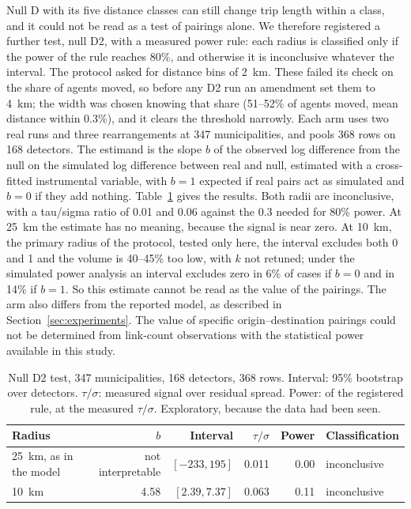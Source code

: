 \documentclass[11pt,a4paper]{article}
\begin{document}
Null D with its five distance classes can still change trip length within a class, and it could not be read as a test of pairings alone. We therefore registered a further test, null D2, with a measured power rule: each radius is classified only if the power of the rule reaches 80\%, and otherwise it is inconclusive whatever the interval. The protocol asked for distance bins of 2~km. These failed its check on the share of agents moved, so before any D2 run an amendment set them to 4~km; the width was chosen knowing that share (51--52\% of agents moved, mean distance within 0.3\%), and it clears the threshold narrowly. Each arm uses two real runs and three rearrangements at 347 municipalities, and pools 368 rows on 168 detectors. The estimand is the slope $b$ of the observed log difference from the null on the simulated log difference between real and null, estimated with a cross-fitted instrumental variable, with $b=1$ expected if real pairs act as simulated and $b=0$ if they add nothing. Table~\ref{tab:d2} gives the results. Both radii are inconclusive, with a tau/sigma ratio of 0.01 and 0.06 against the 0.3 needed for 80\% power. At 25~km the estimate has no meaning, because the signal is near zero. At 10~km, the primary radius of the protocol, tested only here, the interval excludes both 0 and 1 and the volume is 40--45\% too low, with $k$ not retuned; under the simulated power analysis an interval excludes zero in 6\% of cases if $b=0$ and in 14\% if $b=1$. So this estimate cannot be read as the value of the pairings. The arm also differs from the reported model, as described in Section~\ref{sec:experiments}. The value of specific origin--destination pairings could not be determined from link-count observations with the statistical power available in this study.

\begin{table}[htbp]
\centering
\caption{Null D2 test, 347 municipalities, 168 detectors, 368 rows. Interval: 95\% bootstrap over detectors. $\tau/\sigma$: measured signal over residual spread. Power: of the registered rule, at the measured $\tau/\sigma$. Exploratory, because the data had been seen.}
\label{tab:d2}
\begin{tabular}{@{}lrrrrl@{}}
\toprule
Radius & $b$ & Interval & $\tau/\sigma$ & Power & Classification \\
\midrule
25~km, as in the model & not interpretable & $[-233, 195]$ & 0.011 & 0.00 & inconclusive \\
10~km & 4.58 & $[2.39, 7.37]$ & 0.063 & 0.11 & inconclusive \\
\bottomrule
\end{tabular}
\end{table}
\end{document}
